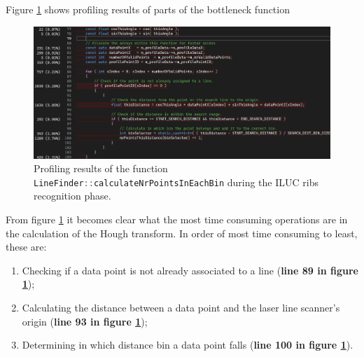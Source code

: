 Figure \ref{fig:profiling_bottleneck} shows profiling results of parts of the bottleneck function
\begin{figure}[H]
    \includegraphics[width=\textwidth]{images/profiling_bottleneck.png}
    \caption{Profiling results of the function \lstinline[language=c]|LineFinder::calculateNrPointsInEachBin| during the ILUC ribs recognition phase.}
    \label{fig:profiling_bottleneck}
\end{figure}

From figure \ref{fig:profiling_bottleneck} it becomes clear what the most time consuming operations are in the calculation of the Hough transform. In order of most time consuming to least, these are:
\begin{enumerate}[label=\textbf{B.N. \arabic*},ref=Bottle Neck \arabic*]
    \item \label{bottlen:line_assocation} Checking if a data point is not already associated to a line (\textbf{line 89 in figure \ref{fig:profiling_bottleneck}});
    \item \label{bottlen:calc_distance} Calculating the distance between a data point and the laser line scanner's origin (\textbf{line 93 in figure \ref{fig:profiling_bottleneck}});
    \item \label{bottlen:bin_assocation}  Determining in which distance bin a data point falls (\textbf{line 100 in figure \ref{fig:profiling_bottleneck}}).
\end{enumerate}